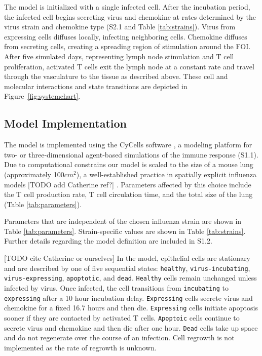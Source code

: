 \documentclass[10pt]{article}
\begin{document}
The model is initialized with a single infected cell.  After the incubation period, the infected cell begins secreting virus and chemokine at rates determined by the virus strain and chemokine type (S2.1 and Table \ref{tab:strains}).  Virus from expressing cells diffuses locally, infecting neighboring cells. Chemokine diffuses from secreting cells, creating a spreading region of stimulation around the FOI. After five simulated days, representing lymph node stimulation and T cell proliferation, activated T cells exit the lymph node at a constant rate and travel through the vasculature to the tissue as described above.  These cell and molecular interactions and state transitions are depicted in Figure~\ref{fig:systemchart}.

\subsection*{Model Implementation}

The model is implemented using the CyCells software \cite{Warrender2006}, a modeling platform for two- or three-dimensional agent-based simulations of the immune response (S1.1).  Due to computational constrains our model is scaled to the size of a mouse lung (approximately 100$cm^2$), a well-established practice in spatially explicit influenza models [TODO add Catherine ref?] \cite{Miller2003, Allan2006, Ingulli2009}.  Parameters affected by this choice include the T cell production rate, T cell circulation time, and the total size of the lung (Table \ref{tab:parameters}).

Parameters that are independent of the chosen influenza strain are shown in Table \ref{tab:parameters}.  Strain-specific values are shown in Table \ref{tab:strains}.  Further details regarding the model definition are included in S1.2.

[TODO cite Catherine or ourselves] In the model, epithelial cells are stationary and are described by one of five sequential states: \texttt{healthy}, \texttt{virus-incubating}, \texttt{virus-expressing}, \texttt{apoptotic}, and \texttt{dead}. \texttt{Healthy} cells remain unchanged unless infected by virus. Once infected, the cell transitions from \texttt{incubating} to \texttt{expressing} after a 10 hour incubation delay. \texttt{Expressing} cells secrete virus and chemokine for a fixed 16.7 hours and then die. \texttt{Expressing} cells initiate apoptosis sooner if they are contacted by activated T cells. \texttt{Apoptoic} cells continue to secrete virus and chemokine and then die after one hour. \texttt{Dead} cells take up space and do not regenerate over the course of an infection.  Cell regrowth is not implemented as the rate of regrowth is unknown. 
\end{document}
